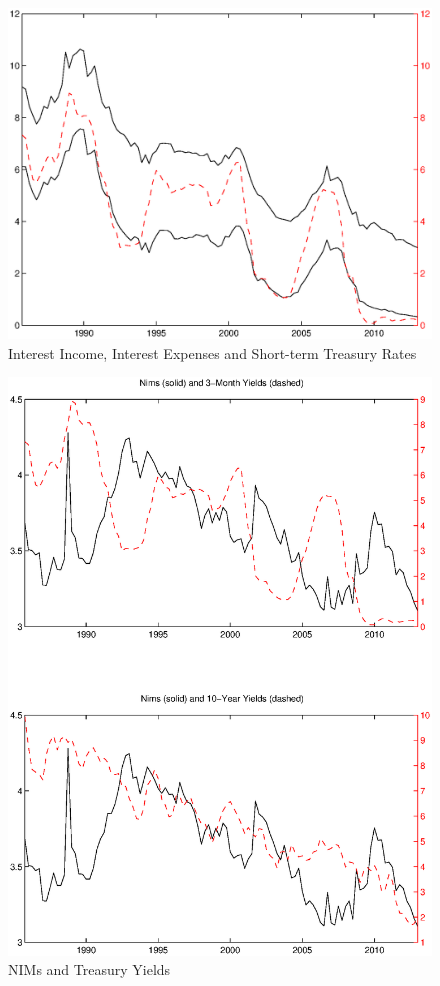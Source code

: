 \documentclass[11pt]{article}
\begin{document}
\clearpage
\begin{figure}
\caption{Interest Income, Interest Expenses and Short-term Treasury Rates} \label{figure_nims_components}
\center
\hspace{-1.5cm}\includegraphics[scale=0.8]{figure_nims_components.ps}
\end{figure}


\begin{figure}
\caption{NIMs and Treasury Yields} \label{figure_nims_rates}
\center
\includegraphics[scale=0.8]{figure_nims_rates.ps}
\end{figure}
\end{document}
